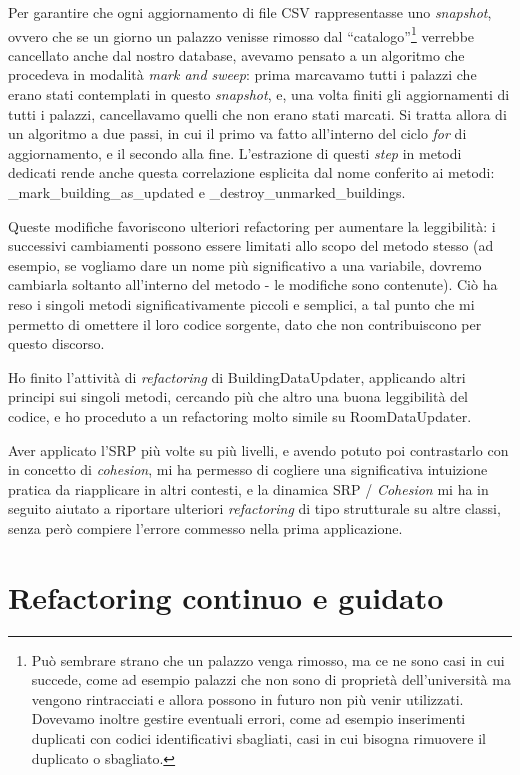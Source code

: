 \documentclass[12pt]{report}
\begin{document}
Per garantire che ogni aggiornamento di
file CSV rappresentasse uno \textit{snapshot}, ovvero che se un giorno un
palazzo venisse rimosso dal ``catalogo''\footnote{
Può sembrare strano che un palazzo venga rimosso, ma ce ne sono casi in cui
succede, come ad esempio palazzi che non sono di proprietà dell'università
ma vengono rintracciati e allora possono in futuro non più venir utilizzati. 
Dovevamo inoltre gestire eventuali errori, come ad esempio inserimenti duplicati
con codici identificativi sbagliati, casi in cui bisogna rimuovere il duplicato
o sbagliato.
}
verrebbe cancellato anche dal nostro database, avevamo pensato a un algoritmo
che procedeva in modalità \textit{mark and sweep}: prima marcavamo tutti i palazzi
che erano stati contemplati in questo \textit{snapshot}, e, una volta
finiti gli aggiornamenti di tutti i palazzi, cancellavamo quelli
che non erano stati marcati. Si tratta allora di un algoritmo a due passi,
in cui il primo va fatto all'interno del ciclo \textit{for} di
aggiornamento, e il 
secondo alla fine. L'estrazione di questi \textit{step} in metodi dedicati
rende anche questa correlazione esplicita dal nome conferito ai metodi:
\_mark\_building\_as\_updated e \_destroy\_unmarked\_buildings.

Queste modifiche favoriscono ulteriori refactoring per 
aumentare la leggibilità: i successivi cambiamenti possono 
essere limitati allo scopo del metodo stesso (ad esempio, 
se vogliamo dare un nome più significativo a una variabile, 
dovremo cambiarla soltanto all'interno del metodo - le modifiche sono
contenute). Ciò ha reso i singoli metodi significativamente piccoli e
semplici, a tal punto che mi permetto di omettere il loro codice sorgente,
dato che non contribuiscono per questo discorso.

Ho finito l'attività di \textit{refactoring} di BuildingDataUpdater,
applicando altri principi sui singoli metodi, cercando più che altro
una buona leggibilità del codice,
e ho proceduto a un refactoring molto simile su RoomDataUpdater. 

Aver applicato l'SRP più volte su più livelli, e avendo potuto poi 
contrastarlo con in concetto di \textit{cohesion}, mi ha permesso 
di cogliere una significativa intuizione pratica da riapplicare in 
altri contesti, e la dinamica SRP / \textit{Cohesion} mi ha in seguito 
aiutato a riportare ulteriori \textit{refactoring} di tipo strutturale 
su altre classi, senza però compiere l'errore commesso nella 
prima applicazione.


%
%
%
%
\chapter{Refactoring continuo e guidato}
\end{document}
